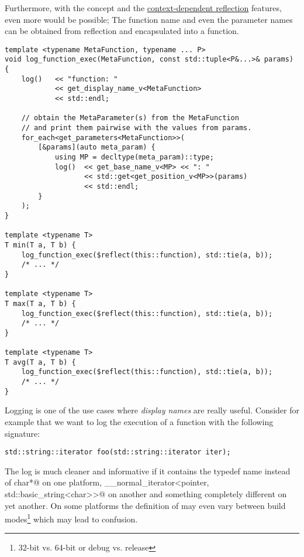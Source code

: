Furthermore, with the  concept and the
\hyperref[context-dependent-reflection]{context-dependent reflection} features,
even more would be possible; The function name and even the parameter names can
be obtained from reflection and encapsulated into a function.

\begin{verbatim}
template <typename MetaFunction, typename ... P>
void log_function_exec(MetaFunction, const std::tuple<P&...>& params) {
	log()   << "function: "
	        << get_display_name_v<MetaFunction>
	        << std::endl;

	// obtain the MetaParameter(s) from the MetaFunction
	// and print them pairwise with the values from params.
	for_each<get_parameters<MetaFunction>>(
		[&params](auto meta_param) {
			using MP = decltype(meta_param)::type;
			log()  << get_base_name_v<MP> << ": "
			       << std::get<get_position_v<MP>>(params)
			       << std::endl;
		}
	);
}

template <typename T>
T min(T a, T b) {
	log_function_exec($reflect(this::function), std::tie(a, b));
	/* ... */
}

template <typename T>
T max(T a, T b) {
	log_function_exec($reflect(this::function), std::tie(a, b));
	/* ... */
}

template <typename T>
T avg(T a, T b) {
	log_function_exec($reflect(this::function), std::tie(a, b));
	/* ... */
}
\end{verbatim}

Logging is one of the use cases where {\em display names} are really useful.
Consider for example that we want to log the execution of a function with
the following signature:

\begin{verbatim}
std::string::iterator foo(std::string::iterator iter);
\end{verbatim}

The log is much cleaner and informative if it contains the typedef name
\verb@iterator@ instead of \verb@const char*@ on one platform,
\verb@__normal_iterator<pointer, std::basic_string<char>>@ on another and
something completely different on yet another. On some platforms the definition
of \verb@iterator@ may even vary between build modes\footnote{32-bit vs. 64-bit or 
debug vs. release} which may lead to confusion.
